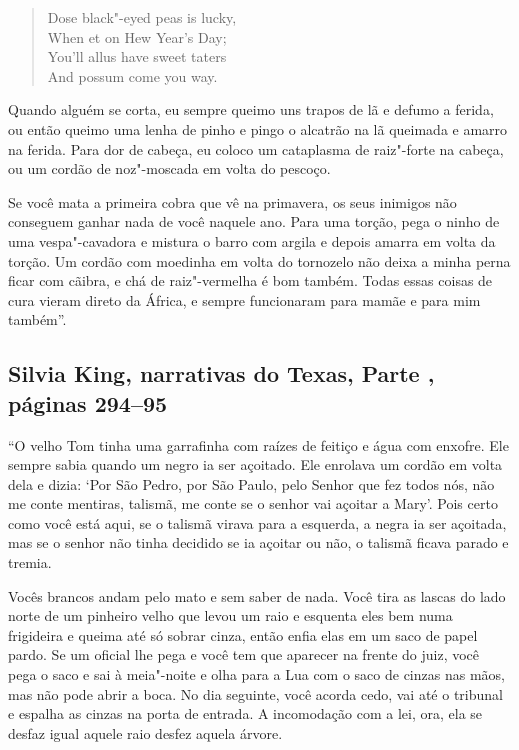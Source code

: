 \begin{verse}
Dose black"-eyed peas is lucky,\\
When et on Hew Year's Day;\\
You'll allus have sweet taters\\ 
And possum come you way.\footnotemark
\end{verse}


Quando alguém se corta, eu sempre queimo uns trapos de lã e defumo a
ferida, ou então queimo uma lenha de pinho e pingo o alcatrão na lã
queimada e amarro na ferida. Para dor de cabeça, eu coloco um cataplasma
de raiz"-forte na cabeça, ou um cordão de noz"-moscada em volta do
pescoço.

Se você mata a primeira cobra que vê na primavera, os seus inimigos não
conseguem ganhar nada de você naquele ano. Para uma torção, pega o ninho
de uma vespa"-cavadora e mistura o barro com argila e depois amarra em
volta da torção. Um cordão com moedinha em volta do tornozelo não deixa
a minha perna ficar com cãibra, e chá de raiz"-vermelha é bom também.
Todas essas coisas de cura vieram direto da África, e sempre funcionaram
para mamãe e para mim também''.

\subsection{Silvia King, narrativas do Texas, Parte , páginas 294--95}
\label{ref167}

``O velho Tom tinha uma garrafinha com raízes de feitiço e água com
enxofre. Ele sempre sabia quando um negro ia ser açoitado. Ele enrolava
um cordão em volta dela e dizia: `Por São Pedro, por São Paulo, pelo
Senhor que fez todos nós, não me conte mentiras, talismã, me conte se o
senhor vai açoitar a Mary'. Pois certo como você está aqui, se o talismã
virava para a esquerda, a negra ia ser açoitada, mas se o senhor não
tinha decidido se ia açoitar ou não, o talismã ficava parado e tremia.

Vocês brancos andam pelo mato e sem saber de nada. Você tira as lascas
do lado norte de um pinheiro velho que levou um raio e esquenta eles bem
numa frigideira e queima até só sobrar cinza, então enfia elas em um
saco de papel pardo. Se um oficial lhe pega e você tem que aparecer na
frente do juiz, você pega o saco e sai à meia"-noite e olha para a Lua
com o saco de cinzas nas mãos, mas não pode abrir a boca. No dia
seguinte, você acorda cedo, vai até o tribunal e espalha as cinzas na
porta de entrada. A incomodação com a lei, ora, ela se desfaz igual
aquele raio desfez aquela árvore.

